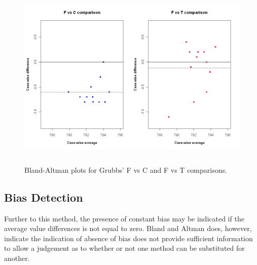 \documentclass[Main.tex]{subfiles}
\begin{document}
	\begin{figure}[h!]
		\begin{center}
			\includegraphics[height=90mm]{images/GrubbsDataTwoBAplots.jpeg}
			\caption{Bland-Altman plots for Grubbs' F vs C and F vs T comparisons.}\label{GrubbsDataTwoBAplots}
		\end{center}
	\end{figure}
	

	

	
	


\subsection{Bias Detection}
Further to this method, the presence of constant bias may be
indicated if the average value differences is not equal to zero. Bland and Altman does, however, indicate the indication of absence
of bias does not provide sufficient information to allow a judgement as to whether or not one method can be substituted for
another.
\end{document}
